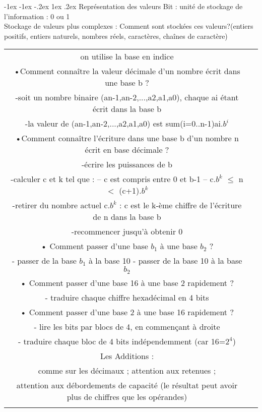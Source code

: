 \documentclass[5pt]{article}
\makeatletter
\renewcommand{\subsubsection}{\@startsection {section}{1}{\z@}%
             {-1ex \@plus -1ex \@minus -.2ex}%
             {1ex \@plus.2ex}%
             {\normalfont\scriptsize\sffamily\bfseries}}
\makeatother
\begin{document}
\begin{scriptsize}
\subsubsection{Représentation des valeurs}
Bit : unité de stockage de l'information : 0 ou 1\\
Stockage de valeurs plus complexes : Comment sont stockées ces valeurs?(entiers positifs, entiers naturels, nombres réels, caractères, chaînes de caractère)\\
\begin{tabular}{|c|c|}
\hline
\begin{tabularx}{0.5\linewidth}{|Y|}
\hline
\textbf{• 1 Entiers positifs}
\\\hline
on utilise la base en indice\\
•Comment connaître la valeur décimale d'un nombre écrit dans une base b ?\\
-soit un nombre binaire (an-1,an-2,...,a2,a1,a0), chaque ai étant écrit dans la base b\\
-la valeur de (an-1,an-2,...,a2,a1,a0) est sum(i=0..n-1)ai.$b^{i}$
\\\hline
•Comment connaître l'écriture dans une base b d'un nombre n écrit en base décimale ?\\
-écrire les puissances de b\\
-calculer c et k tel que : – c est compris entre 0 et b-1 – c.$b^{k}$ $\leq$ n $<$ (c+1).$b^{k}$\\
-retirer du nombre actuel c.$b^{k}$ : c est le k-ème chiffre de l'écriture de n dans la base b\\
-recommencer jusqu'à obtenir 0
\\\hline
• Comment passer d'une base $b_{1}$ à une base $b_{2}$ ?\\
- passer de la base $b_{1}$ à la base 10
- passer de la base 10 à la base $b_{2}$\\
• Comment passer d'une base 16 à une base 2 rapidement ?\\
- traduire chaque chiffre hexadécimal en 4 bits\\
• Comment passer d'une base 2 à une base 16 rapidement ?\\
- lire les bits par blocs de 4, en commençant à droite\\
- traduire chaque bloc de 4 bits indépendemment (car 16=$2^{4}$)
\\ \hline
Les Additions :\\
comme sur les décimaux ; attention aux retenues ;\\
attention aux débordements de capacité (le résultat peut avoir plus de chiffres que les opérandes)\\

\end{tabularx}
\end{tabular}
\end{scriptsize}
\end{document}
